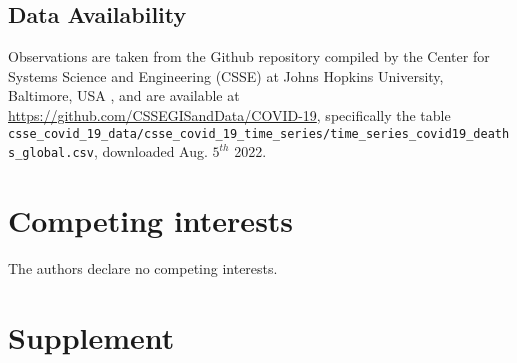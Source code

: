 \documentclass{article}
\begin{document}
\subsection*{Data Availability}
Observations are taken from the Github repository compiled by the Center for Systems Science and Engineering (CSSE) at Johns Hopkins University, Baltimore,
USA \cite{dong2020interactive}, and are available at \url{https://github.com/CSSEGISandData/COVID-19}, specifically the table \newline\verb|csse_covid_19_data/csse_covid_19_time_series/time_series_covid19_deaths_global.csv|, \newline downloaded Aug. $5^{th}$ 2022.

\section*{Competing interests}
The authors declare no competing interests.


\section*{Supplement}

\end{document}
